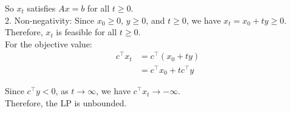 \documentclass{article}
\begin{document}
   So $x_t$ satisfies $Ax = b$ for all $t \geq 0$. \\

2. Non-negativity:
   Since $x_0 \geq 0$, $y \geq 0$, and $t \geq 0$, we have $x_t = x_0 + ty \geq 0$. \\

Therefore, $x_t$ is feasible for all $t \geq 0$. \\

For the objective value:
\begin{align*}
c^{\top}x_t &= c^{\top}(x_0 + ty)\\
&= c^{\top}x_0 + tc^{\top}y
\end{align*}

Since $c^{\top}y < 0$, as $t \to \infty$, we have $c^{\top}x_t \to -\infty$. \\

Therefore, the LP is unbounded.
\end{document}
